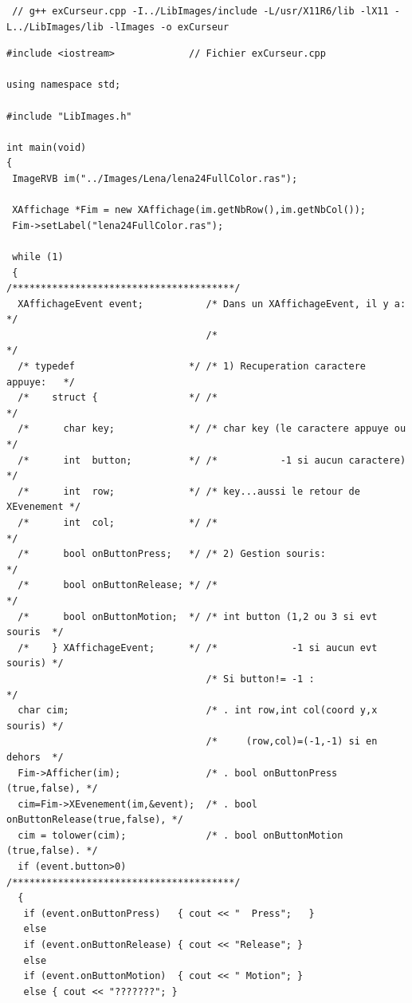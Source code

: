 \documentclass[12pt]{article}
\begin{document}
\begin{scriptsize}
\begin{verbatim}
 // g++ exCurseur.cpp -I../LibImages/include -L/usr/X11R6/lib -lX11 -L../LibImages/lib -lImages -o exCurseur 
\end{verbatim}
\end{scriptsize}
\begin{footnotesize}
\begin{verbatim}
#include <iostream>             // Fichier exCurseur.cpp

using namespace std;

#include "LibImages.h"

int main(void)
{
 ImageRVB im("../Images/Lena/lena24FullColor.ras");

 XAffichage *Fim = new XAffichage(im.getNbRow(),im.getNbCol());
 Fim->setLabel("lena24FullColor.ras");

 while (1)
 {                                 /***************************************/
  XAffichageEvent event;           /* Dans un XAffichageEvent, il y a:    */
                                   /*                                     */
  /* typedef                    */ /* 1) Recuperation caractere appuye:   */
  /*    struct {                */ /*                                     */
  /*      char key;             */ /* char key (le caractere appuye ou    */
  /*      int  button;          */ /*           -1 si aucun caractere)    */
  /*      int  row;             */ /* key...aussi le retour de XEvenement */
  /*      int  col;             */ /*                                     */
  /*      bool onButtonPress;   */ /* 2) Gestion souris:                  */
  /*      bool onButtonRelease; */ /*                                     */
  /*      bool onButtonMotion;  */ /* int button (1,2 ou 3 si evt souris  */
  /*    } XAffichageEvent;      */ /*             -1 si aucun evt souris) */
                                   /* Si button!= -1 :                    */
  char cim;                        /* . int row,int col(coord y,x souris) */
                                   /*     (row,col)=(-1,-1) si en dehors  */
  Fim->Afficher(im);               /* . bool onButtonPress  (true,false), */
  cim=Fim->XEvenement(im,&event);  /* . bool onButtonRelease(true,false), */
  cim = tolower(cim);              /* . bool onButtonMotion (true,false). */
  if (event.button>0)              /***************************************/
  {
   if (event.onButtonPress)   { cout << "  Press";   }
   else
   if (event.onButtonRelease) { cout << "Release"; }
   else
   if (event.onButtonMotion)  { cout << " Motion"; }
   else { cout << "???????"; }


\end{verbatim}
\end{footnotesize}
\end{document}
